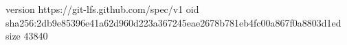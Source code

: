 version https://git-lfs.github.com/spec/v1
oid sha256:2db9e85396e41a62d960d223a367245eae2678b781eb4fc00a867f0a8803d1ed
size 43840
